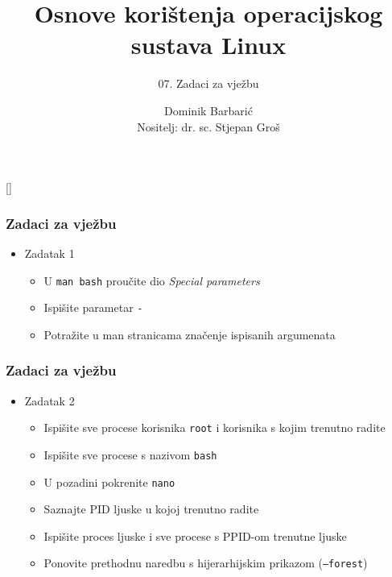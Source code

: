 \documentclass[table,usenames,dvipsnames]{beamer}
\title{Osnove korištenja operacijskog sustava Linux}
\subtitle{07. Zadaci za vježbu}
\author[Dominik Barbarić]{Dominik Barbarić\\ \small{Nositelj: dr. sc. Stjepan Groš}}
\institute[FER]{Sveučilište u Zagrebu \\
				Fakultet elektrotehnike i računarstva}
\date{\todayiso}
\newcommand{\shell}[1]{\texttt{#1}}
\begin{document}
{
[] %

\begin{frame}
\maketitle
\end{frame}
}

\begin{frame}[t]
	\frametitle{Zadaci za vježbu}
	\begin{itemize}
		\item Zadatak 1
		\begin{itemize}
			\item U \shell{man bash} proučite dio \emph{Special parameters}
			\item Ispišite parametar \shell{-}
			\item Potražite u man stranicama značenje ispisanih argumenata
		\end{itemize}
	\end{itemize}
\end{frame}

\begin{frame}[t]
	\frametitle{Zadaci za vježbu}
	\begin{itemize}
		\item Zadatak 2
		\begin{itemize}
			\item Ispišite sve procese korisnika \shell{root} i korisnika s kojim trenutno radite
			\item Ispišite sve procese s nazivom \shell{bash}
			\item U pozadini pokrenite \shell{nano}
			\item Saznajte PID ljuske u kojoj trenutno radite
			\item Ispišite proces ljuske i sve procese s PPID-om trenutne ljuske
			\item Ponovite prethodnu naredbu s hijerarhijskim prikazom (\shell{--forest})
		\end{itemize}
	\end{itemize}
\end{frame}
\end{document}
